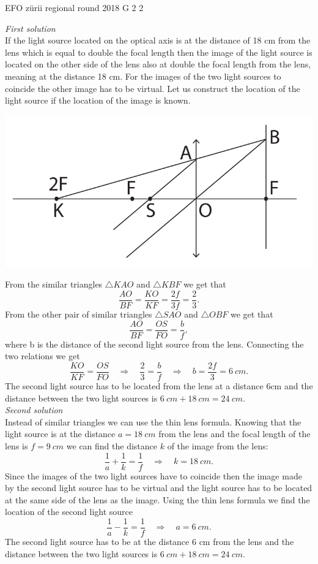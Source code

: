 \documentclass[11pt]{article}
\begin{document}
{EFO zürii} %
{regional round} %
{2018} %
{G 2} %
{2} %
{

\ifEngSolution
\emph{First solution}\\
If the light source located on the optical axis is at the distance of 18 cm from the lens which is equal to double the focal length then the image of the light source is located on the other side of the lens also at double the focal length from the lens, meaning at the distance 18 cm. For the images of the two light sources to coincide the other image has to be virtual. Let us construct the location of the light source if the location of the image is known.
\begin{center}
    \includegraphics[width=0.7\linewidth]{2018-v2g-02-valgusallikaslah}
  \end{center}
From the similar triangles $\triangle KAO$ and $\triangle KBF$ we get that
\[ \frac{AO}{BF} = \frac{KO}{KF} = \frac{2f}{3f} = \frac{2}{3}. \] 
From the other pair of similar triangles $\triangle SAO$ and $\triangle OBF$ we get that
\[  \frac{AO}{BF} = \frac{OS}{FO} = \frac{b}{f},  \] 
where b is the distance of the second light source from the lens. Connecting the two relations we get
\[ \frac{KO}{KF}=\frac{OS}{FO} \quad\Rightarrow\quad \frac{2}{3} = \frac{b}{f} \quad\Rightarrow\quad b = \frac{2f}{3} = \SI{6}{cm}. \] 
The second light source has to be located from the lens at a distance 6cm and the distance between the two light sources is $\SI{6}{cm} + \SI{18}{cm} = \SI{24}{cm}$. \\

\emph{Second solution}\\
Instead of similar triangles we can use the thin lens formula. Knowing that the light source is at the distance $a = \SI{18}{cm}$ from the lens and the focal length of the lens is $f=\SI{9}{cm}$ we can find the distance $k$ of the image from the lens:
\[ \frac{1}{a} + \frac{1}{k} = \frac{1}{f} \quad\Rightarrow\quad k = \SI{18}{cm}. \] 
Since the images of the two light sources have to coincide then the image made by the second light source has to be virtual and the light source has to be located at the same side of the lens as the image. Using the thin lens formula we find the location of the second light source 
\[ \frac{1}{a} - \frac{1}{k} = \frac{1}{f} \quad\Rightarrow\quad a = \SI{6}{cm}. \] 
The second light source has to be at the distance 6 cm from the lens and the distance between the two light sources is $\SI{6}{cm} + \SI{18}{cm} = \SI{24}{cm}$.
\fi
}
\end{document}
